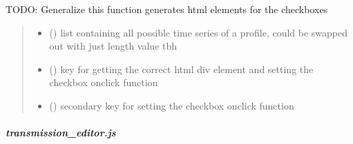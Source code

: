 \documentclass[letterpaper,10pt,english]{sphinxmanual}
\begin{document}
\begin{fulllineitems}
\label{\detokenize{docs_gui/js_api/urbs_editor/timevareff_editor:populatTimevareffEditor}}
\pysigstartsignatures
{}
\pysigstopsignatures
\sphinxAtStartPar
TODO: Generalize this function
generates html elements for the checkboxes
\begin{quote}\begin{description}
\begin{itemize}
\item {} 
\sphinxAtStartPar
{} () \textendash{} list containing all possible time series of a profile, could be swapped out with just length value tbh

\item {} 
\sphinxAtStartPar
{} () \textendash{} key for getting the correct html div element and setting the checkbox onclick function

\item {} 
\sphinxAtStartPar
{} () \textendash{} secondary key for setting the checkbox onclick function

\end{itemize}

\end{description}\end{quote}

\end{fulllineitems}


\sphinxstepscope


\subparagraph{transmission\_editor.js}
\label{\detokenize{docs_gui/js_api/urbs_editor/transmission_editor:transmission-editor-js}}\label{\detokenize{docs_gui/js_api/urbs_editor/transmission_editor::doc}}
\end{document}
